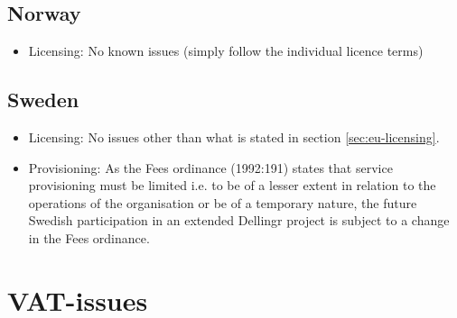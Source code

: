 \documentclass{article}
\newcommand{\dell}{Dellingr\xspace}
\begin{document}
\subsection{Norway}
\begin{itemize}
    \item [] Licensing:
    No known issues (simply follow the individual licence terms)
    \end{itemize}
    
\subsection{Sweden}
\begin{itemize}
    \item [] Licensing:
    No issues other than what is stated in section \ref{sec:eu-licensing}.     \item[] Provisioning:
As the Fees ordinance (1992:191) states that service provisioning must be limited i.e. to be of a lesser extent in relation to the operations of the organisation or be of a temporary nature, the future Swedish participation in an extended \dell project is subject to a change in the Fees ordinance.
\end{itemize}
    
\section{VAT-issues} 
\end{document}
